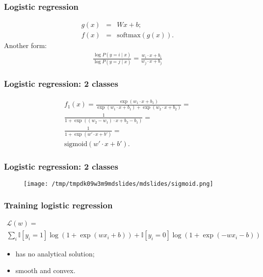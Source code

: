 \documentclass[mathserif, aspectratio=43]{beamer}
\begin{document}
\begin{frame}[fragile]
\frametitle{Logistic regression}
\begin{eqnarray*}
  g(x) &=& W x + b;\\
  f(x) &=& \mathrm{softmax}(g(x)).
\end{eqnarray*}
Another form:
\begin{eqnarray*}
  \frac{\log P(y = i \mid x)}{\log P(y = j \mid x)} = \frac{w_i \cdot x + b_i}{w_j \cdot x + b_j}
\end{eqnarray*}

\end{frame}


\begin{frame}[fragile]
\frametitle{Logistic regression: 2 classes}
\begin{multline*}
  f_1(x) = \frac{\exp(w_1 \cdot x + b_1)}{\exp(w_1 \cdot x + b_1) + \exp(w_2 \cdot x + b_2)} =\\[5mm]
    \frac{1}{1 + \exp((w_2 - w_1) \cdot x + b_2 - b_1)} =\\[5mm]
    \frac{1}{1 + \exp(w' \cdot x + b')} = \\[5mm]
    \mathrm{sigmoid}(w' \cdot x + b').
\end{multline*}

\end{frame}


\begin{frame}[fragile]
\frametitle{Logistic regression: 2 classes}
\begin{figure}
\centering
\texttt{[image: /tmp/tmpdk09w3m9mdslides/mdslides/sigmoid.png]}

\end{figure}


\end{frame}


\begin{frame}[fragile]
\frametitle{Training logistic regression}
\begin{multline*}
  \mathcal{L}(w) = \\
  \sum_i \mathbb{I}[y_i = 1] \log (1 + \exp(w x_i + b)) + \mathbb{I}[y_i = 0] \log (1 + \exp(-w x_i - b))
\end{multline*}
\begin{itemize}
\item has no analytical solution;
\item smooth and convex.
\end{itemize}

\end{frame}
\end{document}
